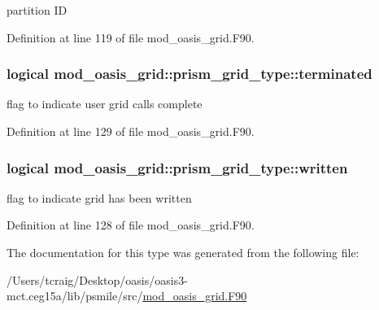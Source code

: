 partition I\+D 



Definition at line 119 of file mod\+\_\+oasis\+\_\+grid.\+F90.

\hypertarget{structmod__oasis__grid_1_1prism__grid__type_a2dcbbc51a20f881a1d06609688d72734}{
\subsubsection[{terminated}]{\setlength{\rightskip}{0pt plus 5cm}logical mod\+\_\+oasis\+\_\+grid\+::prism\+\_\+grid\+\_\+type\+::terminated\hspace{0.3cm}{\ttfamily [private]}}}\label{structmod__oasis__grid_1_1prism__grid__type_a2dcbbc51a20f881a1d06609688d72734}


flag to indicate user grid calls complete 



Definition at line 129 of file mod\+\_\+oasis\+\_\+grid.\+F90.

\hypertarget{structmod__oasis__grid_1_1prism__grid__type_a48d243ede1b306ac35bb9bbeff48785a}{
\subsubsection[{written}]{\setlength{\rightskip}{0pt plus 5cm}logical mod\+\_\+oasis\+\_\+grid\+::prism\+\_\+grid\+\_\+type\+::written\hspace{0.3cm}{\ttfamily [private]}}}\label{structmod__oasis__grid_1_1prism__grid__type_a48d243ede1b306ac35bb9bbeff48785a}


flag to indicate grid has been written 



Definition at line 128 of file mod\+\_\+oasis\+\_\+grid.\+F90.



The documentation for this type was generated from the following file\+:\begin{DoxyCompactItemize}
\item 
/\+Users/tcraig/\+Desktop/oasis/oasis3-\/mct.\+ceg15a/lib/psmile/src/\hyperlink{mod__oasis__grid_8_f90}{mod\+\_\+oasis\+\_\+grid.\+F90}\end{DoxyCompactItemize}
